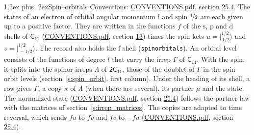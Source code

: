 \documentclass[10pt,a4paper]{article}
\makeatletter
\renewcommand\section{\@startsection{section}{1}{\z@}{-3ex plus -1ex minus -.2ex}%
  {1.2ex plus .2ex}{\normalfont\large\sffamily\bfseries\color{parttitle}}}
\numberwithin{equation}{section}
\newcommand{\grp}[1]{\mathsf{#1}}
\newcommand{\orbital}[1]{\mathrm{#1}}
\newcommand{\mult}{\kappa}
\newcommand{\intx}{\mu}
\newcommand{\jm}[2]{\bigl\lvert{}^{#1}_{\,#2}\bigr\rangle}
\makeatother
\begin{document}
\section{Spin--orbitals}\label{s:spin_orbitals}
Conventions: \href{../../CONVENTIONS.pdf}{CONVENTIONS.pdf}, section \href{../../CONVENTIONS.pdf\#conv.25.4}{25.4}.
\leavevmode\label{n:index.orbital.l}The states of an electron of orbital angular momentum $l$ and spin $\nicefrac{1}{2}$ are each given up to a positive factor. \label{n:local.spinor.uv}\label{n:local.function.f}They are written in the functions $f$ of the $\orbital{s}$, $\orbital{p}$ and $\orbital{d}$ shells of \href{../../../rotation/data/pdf/C11.pdf}{$\grp{C_{11}}$} (\href{../../CONVENTIONS.pdf}{CONVENTIONS.pdf}, section \href{../../../rotation/CONVENTIONS.pdf\#conv.13}{13}) times the spin kets $u = \jm{1/2}{1/2}$ and $v = \jm{1/2}{-1/2}$. The record also holds the $\orbital{f}$ shell (\texttt{spinorbitals}). An orbital level consists of the functions of degree $l$ that carry the irrep $\Gamma$ of \href{../../../rotation/data/pdf/C11.pdf}{$\grp{C_{11}}$}. With the spin, it splits into the spinor irreps $\Lambda$ of $\grp{2C_{11}}$, those of the doublet of $\Gamma$ in the spin--orbit levels (section~\ref{s:spin_orbit}, first column). \label{n:head.state}Under the heading of its shell, a row gives $\Gamma$, a copy $\mult$ of $\Lambda$ (when there are several), its partner $\intx$ and the state. The normalized state (\href{../../CONVENTIONS.pdf}{CONVENTIONS.pdf}, section \href{../../CONVENTIONS.pdf\#conv.25.4}{25.4}) follows the partner law with the matrices of section~\ref{s:irrep_matrices}. The copies are adapted to time reversal, which sends $f u$ to $f v$ and $f v$ to $-f u$ (\href{../../CONVENTIONS.pdf}{CONVENTIONS.pdf}, section \href{../../CONVENTIONS.pdf\#conv.25.4}{25.4}).
\end{document}
